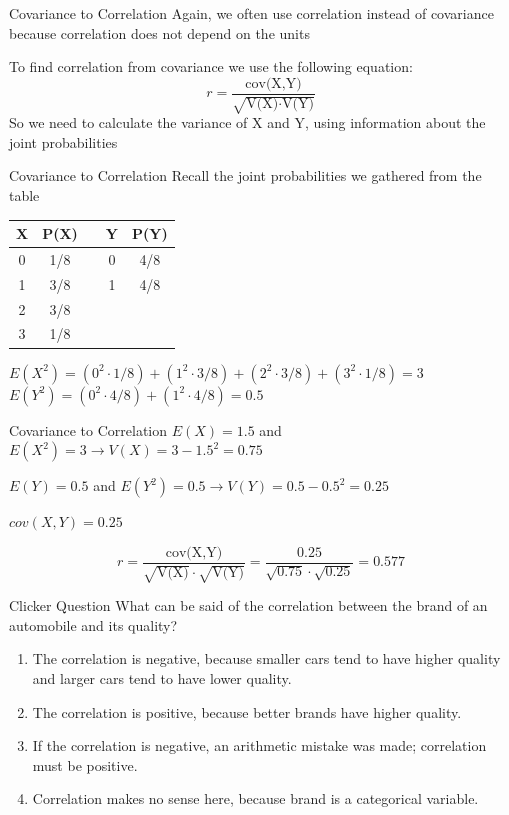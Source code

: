 \documentclass{beamer}
\begin{document}
\begin{frame}{Covariance to Correlation}
	Again, we often use correlation instead of covariance because correlation \alert{does not depend on the units}
	
	To find correlation from covariance we use the following equation:
	$$r = \frac{\text{cov(X,Y)}}{\sqrt{\text{V(X)}\cdot \text{V(Y)}}}$$
	So we need to calculate the variance of X and Y, using information about the joint probabilities
\end{frame}

\begin{frame}{Covariance to Correlation}
	Recall the joint probabilities we gathered from the table
	\begin{center}
		\begin{tabular}{c|ccc|c}
			X & P(X) &   & Y & P(Y) \\
			\hline
			0 & 1/8  &   & 0 & 4/8  \\
			1 & 3/8  &   & 1 & 4/8  \\
			2 & 3/8  &   &   &      \\
			3 & 1/8  &   &   &      \\
		\end{tabular}
	\end{center}
	
	$ E(X^2) = (0^2 \cdot 1/8) + (1^2 \cdot 3/8) + (2^2 \cdot 3/8) + (3^2 \cdot 1/8) =3$ \\
	
	$ E(Y^2)=(0^2 \cdot 4/8) + (1^2 \cdot 4/8) =0.5$
	
\end{frame}

\begin{frame}{Covariance to Correlation}
	$E(X)=1.5$ and $E(X^2)=3 \rightarrow V(X)=3-1.5^2= 0.75$
	
	$E(Y)=0.5$ and $E(Y^2)=0.5 \rightarrow V(Y)=0.5-0.5^2 = 0.25$
	
	$cov(X,Y)=0.25$
	
	$$r = \frac{\text{cov(X,Y)}}{\sqrt{\text{V(X)}}\cdot \sqrt{\text{V(Y)}}} =\frac{0.25}{\sqrt{0.75}\cdot\sqrt{0.25}}=0.577$$
\end{frame}

\begin{frame}{Clicker Question}
	What can be said of the correlation between the brand of an automobile and its quality?
	\begin{enumerate}[label=(\alph*)]
		\item The correlation is negative, because smaller cars tend to have higher quality and larger cars tend to have lower quality.
		\item The correlation is positive, because better brands have higher quality.
		\item If the correlation is negative, an arithmetic mistake was made; correlation must be positive.
		\item Correlation makes no sense here, because brand is a categorical variable. %
	\end{enumerate}
\end{frame}
\end{document}
